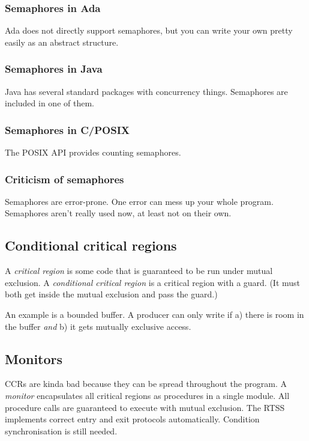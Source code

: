 \documentclass[a4paper, 12pt]{article}
\begin{document}
\subsubsection{Semaphores in Ada}
Ada does not directly support semaphores, but you can write your own pretty easily as an abstract structure.

\subsubsection{Semaphores in Java}
Java has several standard packages with concurrency things. Semaphores are included in one of them.

\subsubsection{Semaphores in C/POSIX}
The POSIX API provides counting semaphores.

\subsubsection{Criticism of semaphores}
Semaphores are error-prone. One error can mess up your whole program. Semaphores aren't really used now, at least not on their own.

\subsection{Conditional critical regions}
A \emph{critical region} is some code that is guaranteed to be run under mutual exclusion. A \emph{conditional critical region} is a critical region with a guard. (It must both get inside the mutual exclusion and pass the guard.)

An example is a bounded buffer. A producer can only write if a) there is room in the buffer \emph{and} b) it gets mutually exclusive access.

\subsection{Monitors}
CCRs are kinda bad because they can be spread throughout the program.
A \emph{monitor} encapsulates all critical regions as procedures in a single module. All procedure calls are guaranteed to execute with mutual exclusion. The RTSS implements correct entry and exit protocols automatically. Condition synchronisation is still needed.
\end{document}
